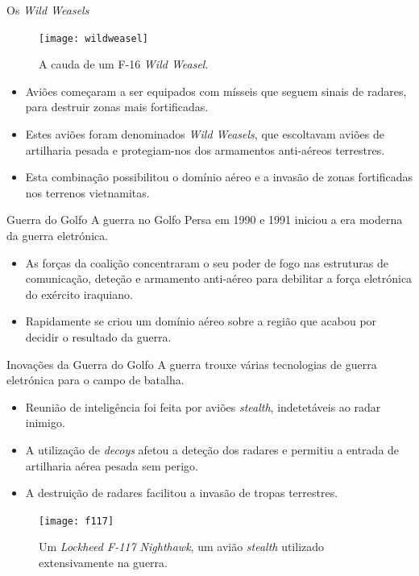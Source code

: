 \documentclass[portuguese,10pt]{beamer}
\begin{document}
\begin{frame}{Os \textit{Wild Weasels}}
    \begin{minipage}[c]{0.44\textwidth}
        \begin{figure}
            \centering
            \texttt{[image: wildweasel]}
            \caption{A cauda de um F-16 \textit{Wild Weasel}.}
        \end{figure}
    \end{minipage}
    \hfill
    \begin{minipage}[c]{0.55\textwidth}
        \begin{itemize}
            \item Aviões começaram a ser equipados com mísseis que seguem sinais de radares, para destruir zonas mais fortificadas.
            \item Estes aviões foram denominados \textit{Wild Weasels}, que escoltavam aviões de artilharia pesada e protegiam-nos dos armamentos anti-aéreos terrestres.
            \item Esta combinação possibilitou o domínio aéreo e a invasão de zonas fortificadas nos terrenos vietnamitas.
        \end{itemize}
    \end{minipage}
\end{frame}

\begin{frame}{Guerra do Golfo}
    A guerra no Golfo Persa em 1990 e 1991 iniciou a era moderna da guerra eletrónica.
    \begin{itemize}
        \item As forças da coalição concentraram o seu poder de fogo nas estruturas de comunicação, deteção e armamento anti-aéreo para debilitar a força eletrónica do exército iraquiano.
        \item Rapidamente se criou um domínio aéreo sobre a região que acabou por decidir o resultado da guerra.
    \end{itemize}
\end{frame}

\begin{frame}{Inovações da Guerra do Golfo}
    A guerra trouxe várias tecnologias de guerra eletrónica para o campo de batalha.
    \begin{itemize}
        \item Reunião de inteligência foi feita por aviões \textit{stealth}, indetetáveis ao radar inimigo.
        \item A utilização de \textit{decoys} afetou a deteção dos radares e permitiu a entrada de artilharia aérea pesada sem perigo.
        \item A destruição de radares facilitou a invasão de tropas terrestres.
    \end{itemize}
    \begin{figure}
        \centering
        \texttt{[image: f117]}
        \caption{Um \textit{Lockheed F-117 Nighthawk}, um avião \textit{stealth} utilizado extensivamente na guerra.}
    \end{figure}
\end{frame}
\end{document}
